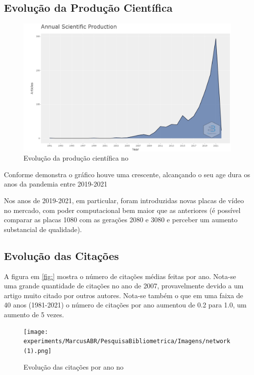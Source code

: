\subsection{Evolução da Produção Científica}



\begin{figure}[ht]
    \centering
    \includegraphics[width=12cm]{experiments/MarcusABR/PesquisaBibliometrica/Imagens/newplot.png}
    \caption{Evolução da produção científica no \dataset\ }
    \label{fig:evolucao}
\end{figure}

Conforme demonstra o gráfico houve uma crescente, alcançando o seu age dura os anos da pandemia entre 2019-2021

Nos anos de 2019-2021, em particular, foram introduzidas novas placas de vídeo no mercado, com poder computacional bem maior que as anteriores (é possível comparar as placas 1080 com as gerações 2080 e 3080 e perceber um aumento substancial de qualidade).

\subsection{Evolução das Citações}

A figura em \ref{fig:} mostra o número de citações médias feitas por ano. Nota-se uma grande quantidade de citações no ano de 2007, provavelmente devido a um artigo muito citado por outros autores. Nota-se também o que em uma faixa de 40 anos (1981-2021) o número de citações por ano aumentou de 0.2 para 1.0, um aumento de 5 vezes.

\begin{figure}[ht]
    \centering
    \texttt{[image: experiments/MarcusABR/PesquisaBibliometrica/Imagens/network(1).png]}
    \caption{Evolução das citações por ano no \textit{}}
    \label{fig:gpu-citation-year}
\end{figure}

